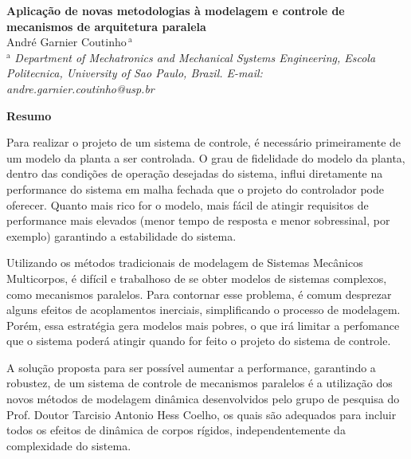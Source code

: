 \documentclass[a4paper,11pt,brazil,fleqn]{article}
\begin{document}

\setcounter{MaxMatrixCols}{50}

\noindent
{\bf \huge Aplica\c{c}\~ao de novas metodologias \`a modelagem e controle de mecanismos de arquitetura paralela}\\

\noindent
{\Large 		Andr\'e Garnier Coutinho$\,{}^\text{a}$
}\\

\noindent
{${}^\text{a}$ \it Department of Mechatronics and Mechanical Systems Engineering, Escola Politecnica, 
University of Sao Paulo, Brazil. E-mail: andre.garnier.coutinho@usp.br}

\vspace{24pt}
%

\begin{center}
\textbf{Resumo}
\end{center}

Para realizar o projeto de um sistema de controle, \'e necess\'ario primeiramente de um modelo da planta a ser controlada. O grau de fidelidade do modelo da planta, dentro das condi\c{c}\~oes de opera\c{c}\~ao desejadas do sistema, influi diretamente na performance do sistema em malha fechada que o projeto do controlador pode oferecer. Quanto mais rico for o modelo, mais f\'acil de atingir requisitos de performance mais elevados (menor tempo de resposta e menor sobressinal, por exemplo) garantindo a estabilidade do sistema.

Utilizando os m\'etodos tradicionais de modelagem de Sistemas Mec\^anicos Multicorpos, \'e dif\'icil e trabalhoso de se obter modelos de sistemas complexos, como mecanismos paralelos. Para contornar esse problema, \'e comum desprezar alguns efeitos de acoplamentos inerciais, simplificando o processo de modelagem. Por\'em, essa estrat\'egia gera modelos mais pobres, o que ir\'a limitar a perfomance que o sistema poder\'a atingir quando for feito o projeto do sistema de controle.

A solu\c{c}\~ao proposta para ser poss\'ivel aumentar a performance, garantindo a robustez, de um sistema de controle de mecanismos paralelos \'e a utiliza\c{c}\~ao dos novos m\'etodos de modelagem din\^amica desenvolvidos pelo grupo de pesquisa do Prof. Doutor Tarcisio Antonio Hess Coelho, os quais s\~ao adequados para incluir todos os efeitos de din\^amica de corpos r\'igidos, independentemente da complexidade do sistema.
\end{document}
